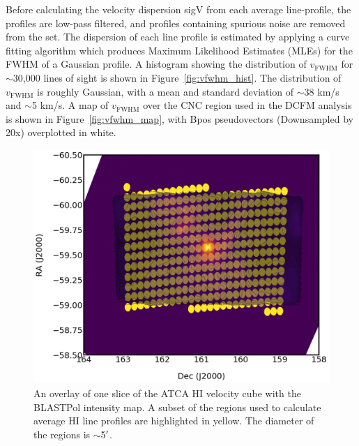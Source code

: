 Before calculating the velocity dispersion \gls{sigV} from each average line-profile, the profiles are low-pass filtered, and profiles containing spurious noise are removed from the set. The dispersion of each line profile is estimated by applying a curve fitting algorithm which produces Maximum Likelihood Estimates (MLEs) for the FWHM of a Gaussian profile. A histogram showing the distribution of $v_{\mathrm{FWHM}}$ for $\sim$30,000 lines of sight is shown in Figure~\ref{fig:vfwhm_hist}. The distribution of $v_{\mathrm{FWHM}}$ is roughly Gaussian, with a mean and standard deviation of $\sim$38 km/s and $\sim$5 km/s. A map of $v_{\mathrm{FWHM}}$ over the CNC region used in the DCFM analysis is shown in Figure~\ref{fig:vfwhm_map}, with \gls{Bpos} pseudovectors (Downsampled by 20x) overplotted in white.

\begin{figure}[!htbp]
\centering
\includegraphics[width=\textwidth]{figures/carina/HI_vselect}
\caption[~An overlay of one slice of the ATCA HI velocity cube with the BLASTPol intensity map.]{An overlay of one slice of the ATCA $\mathrm{HI}$ velocity cube with the BLASTPol intensity map. A subset of the regions used to calculate average HI line profiles are highlighted in yellow. The diameter of the regions is $\sim$5$\operatorname{^{\prime}}$.}
\label{fig:HI_vselect}
\end{figure}


